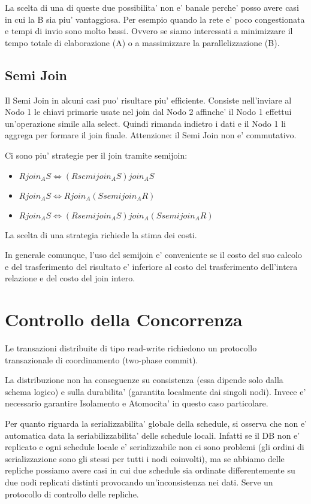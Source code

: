 La scelta di una di queste due possibilita' non e' banale perche' posso avere casi in cui la B sia piu' vantaggiosa. Per esempio quando la rete e' poco congestionata e tempi di invio sono molto bassi.
Ovvero se siamo interessati a minimizzare il tempo totale di elaborazione (A) o a massimizzare la parallelizzazione (B).

\subsection{Semi Join}

Il Semi Join in alcuni casi puo' risultare piu' efficiente. Consiste nell'inviare al Nodo 1 le chiavi primarie usate nel join dal Nodo 2 affinche' il Nodo 1 effettui un'operazione simile alla select. Quindi rimanda indietro i dati e il Nodo 1 li aggrega per formare il join finale.
Attenzione: il Semi Join non e' commutativo.

Ci sono piu' strategie per il join tramite semijoin:

\begin{itemize}
  \item $R join_A S \Leftrightarrow (R semijoin_A S) join_A S$
  \item $R join_A S \Leftrightarrow R join_A(S semijoin_A R)$
  \item $R join_A S \Leftrightarrow (R semijoin_A S) join_A (S semijoin_A R)$
\end{itemize}

La scelta di una strategia richiede la stima dei costi.

In generale comunque, l'uso del semijoin e' conveniente se il costo del suo calcolo e del trasferimento del risultato e' inferiore al costo del trasferimento dell'intera relazione e del costo del join intero.

\section{Controllo della Concorrenza}

Le transazioni distribuite di tipo read-write richiedono un protocollo transazionale di coordinamento (two-phase commit).

La distribuzione non ha conseguenze su consistenza (essa dipende solo dalla schema logico) e sulla durabilita' (garantita localmente dai singoli nodi).
Invece e' necessario garantire Isolamento e Atomocita' in questo caso particolare.

Per quanto riguarda la serializzabilita' globale della schedule, si osserva che non e' automatica data la seriabilizzabilita' delle schedule locali.
Infatti se il DB non e' replicato e ogni schedule locale e' serializzabile non ci sono problemi (gli ordini di serializzazione sono gli stessi per tutti i nodi coinvolti), ma se abbiamo delle repliche possiamo avere casi in cui due schedule sia ordinate differentemente su due nodi replicati distinti provocando un'inconsistenza nei dati.
Serve un protocollo di controllo delle repliche.

